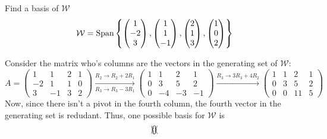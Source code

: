 \begin{example}{}{}
    Find a basis of $\mathcal{W}$ 
    \[
        \mathcal{W} = \text{Span}\left\{
            \begin{pmatrix}
                1 \\ -2 \\ 3
            \end{pmatrix},
            \begin{pmatrix}
                1 \\ 1 \\ -1
            \end{pmatrix},
            \begin{pmatrix}
                2 \\ 1 \\ 3
            \end{pmatrix},
            \begin{pmatrix}
                1 \\ 0 \\ 2
            \end{pmatrix}
         \right\} 
    \]
    \begin{solution}
        Consider the matrix who's columns are the vectors in the generating set of $\mathcal{W}$:
        \[
            A = \begin{pmatrix}
                1 & 1 & 2 & 1 \\
                -2 & 1 & 1 & 0 \\
                3 & -1 & 3 & 2
            \end{pmatrix} 
            \xrightarrow[R_3 \to R_3 - 3R_1]{R_2 \to R_2 + 2R_1}
            \begin{pmatrix}
                1 & 1 & 2 & 1 \\
                0 & 3 & 5 & 2 \\
                0 & -4 & -3 & -1
            \end{pmatrix} 
            \xrightarrow{R_3 \to 3R_3 + 4R_2}
            \begin{pmatrix}
                1 & 1 & 2 & 1 \\
                0 & 3 & 5 & 2 \\
                0 & 0 & 11 & 5
            \end{pmatrix}
        \]
        Now, since there isn't a pivot in the fourth column, the fourth vector in the generating set is redudant. Thus, one possible basis for $\mathcal{W}$ is 
        \[
            \left\{
                \begin{pmatrix}

\end{pmatrix} \right\}\]
\end{solution}
\end{example}
